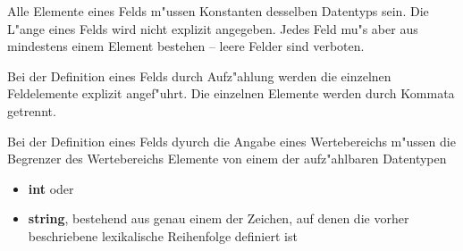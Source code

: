 \begin{center}
\end{center}

Alle Elemente eines Felds m"ussen Konstanten
 desselben Datentyps sein. Die L"ange
 eines Felds wird nicht explizit angegeben.
Jedes Feld mu"s aber aus mindestens einem Element bestehen -- leere
Felder  sind verboten.

\label{internarraydef}

Bei der Definition eines Felds durch Aufz"ahlung werden die einzelnen
Feldelemente
explizit angef"uhrt. Die einzelnen Elemente werden durch Kommata
getrennt.

Bei der Definition eines Felds dyurch die Angabe eines
Wertebereichs m"ussen die Begrenzer des
Wertebereichs Elemente von einem der aufz"ahlbaren Datentypen

\begin{itemize}
\item {\bf int} oder  

\item {\bf string}, bestehend aus genau einem der
Zeichen,  auf denen die vorher
beschriebene lexikalische 
 Reihenfolge definiert ist
\end{itemize}

